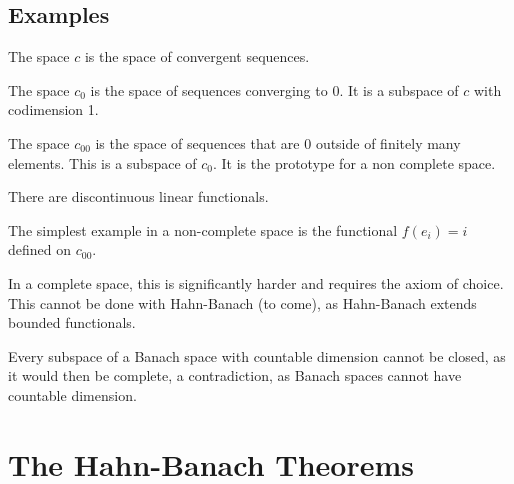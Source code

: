 \documentclass[twoside,symmetric, openany, 12pt]{./tuftebook}
\theoremstyle{definition}
\theoremstyle{definition}
\theoremstyle{definition}
\begin{document}
\subsection{Examples}
\begin{Example}
	The space $c$ is the space of convergent sequences.
\end{Example}
\begin{Example}
	The space $c_0$ is the space of sequences converging to 0. It is a subspace of $c$ with codimension 1.
\end{Example}
\begin{Example}
	The space $c_{00}$ is the space of sequences that are 0 outside of finitely many elements. This is a subspace of $c_0$. It is the prototype for a non complete space. 
\end{Example}
\begin{Example}
	There are discontinuous linear functionals.
	
	The simplest example in a non-complete space is the functional $f(e_i)=i$ defined on $c_{00}$. 
	
	In a complete space, this is significantly harder and requires the axiom of choice. This cannot be done with Hahn-Banach (to come), as Hahn-Banach extends bounded functionals. 
\end{Example}
\begin{Example}
	Every subspace of a Banach space with countable dimension cannot be closed, as it would then be complete, a contradiction, as Banach spaces cannot have countable dimension. 
\end{Example}
	\section{The Hahn-Banach Theorems}
\end{document}
